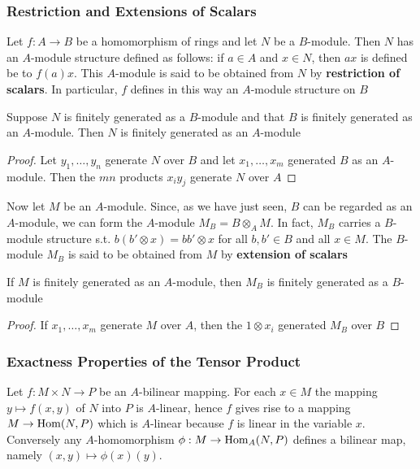 \documentclass[11pt]{article}
\begin{document}
\subsubsection*{Restriction and Extensions of Scalars}
\label{sec:org9151453}
Let \(f:A\to B\) be a homomorphism of rings and let \(N\) be a \(B\)-module. Then \(N\) has
an \(A\)-module structure defined as follows: if \(a\in A\) and \(x\in N\), then \(ax\) is defined
be to \(f(a)x\). This \(A\)-module is said to be obtained from \(N\) by \textbf{restriction of scalars}.
In particular, \(f\) defines in this way an \(A\)-module structure on \(B\)

\begin{proposition}[]
Suppose \(N\) is finitely generated as a \(B\)-module and that \(B\) is finitely generated as
an \(A\)-module. Then \(N\) is finitely generated as an \(A\)-module
\end{proposition}

\begin{proof}
Let \(y_1,\dots,y_n\) generate \(N\) over \(B\) and let \(x_1,\dots,x_m\) generated \(B\) as
an \(A\)-module. Then the \(mn\) products \(x_iy_j\) generate \(N\) over \(A\)
\end{proof}

Now let \(M\) be an \(A\)-module. Since, as we have just seen, \(B\) can be regarded as
an \(A\)-module, we can form the \(A\)-module \(M_B=B\otimes_AM\). In fact, \(M_B\) carries
a \(B\)-module structure s.t. \(b(b'\otimes x)=bb'\otimes x\) for all \(b,b'\in B\) and all \(x\in M\).
The \(B\)-module \(M_B\) is said to be obtained from \(M\) by \textbf{extension of scalars}

\begin{proposition}[]
If \(M\) is finitely generated as an \(A\)-module, then \(M_B\) is finitely generated as a \(B\)-module
\end{proposition}

\begin{proof}
If \(x_1,\dots,x_m\) generate \(M\) over \(A\), then the \(1\otimes x_i\) generated \(M_B\) over \(B\)
\end{proof}
\subsubsection*{Exactness Properties of the Tensor Product}
\label{sec:orgbca1115}
Let \(f:M\times N\to P\) be an \(A\)-bilinear mapping. For each \(x\in M\) the mapping \(y\mapsto f(x,y)\)
of \(N\) into \(P\) is \(A\)-linear, hence \(f\) gives rise to a mapping \(M\to\operatorname{Hom}(N,P)\) which
is \(A\)-linear because \(f\) is linear in the variable \(x\). Conversely
any \(A\)-homomorphism \(\phi:M\to\operatorname{Hom}_A(N,P)\) defines a bilinear map, namely \((x,y)\mapsto\phi(x)(y)\).
\end{document}
